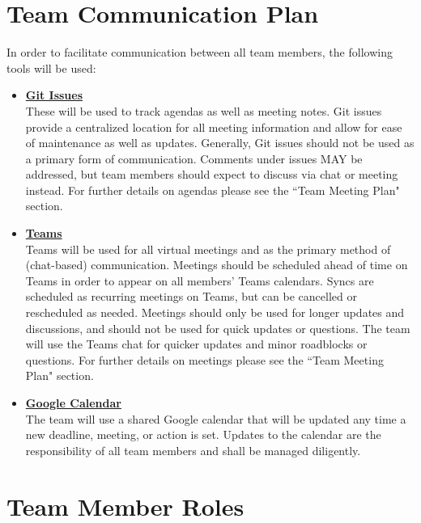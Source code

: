 \documentclass{article}
\begin{document}
\section{Team Communication Plan}
In order to facilitate communication between all team members, the following tools will be used:

\begin{itemize}
	\item \textbf{\underline{Git Issues}} \\
	      These will be used to track agendas as well as meeting notes.
	      Git issues provide a centralized location for all meeting information and allow for ease of maintenance as well as updates.
	      Generally, Git issues should not be used as a primary form of communication.
	      Comments under issues MAY be addressed, but team members should expect to discuss via chat or meeting instead.
	      For further details on agendas please see the ``Team Meeting Plan" section.

	\item \textbf{\underline{Teams}} \\
	      Teams will be used for all virtual meetings and as the primary method of (chat-based) communication.
	      Meetings should be scheduled ahead of time on Teams in order to appear on all members' Teams calendars.
	      Syncs are scheduled as recurring meetings on Teams, but can be cancelled or rescheduled as needed.
	      Meetings should only be used for longer updates and discussions, and should not be used for quick updates or questions.
	      The team will use the Teams chat for quicker updates and minor roadblocks or questions.
	      For further details on meetings please see the ``Team Meeting Plan" section.

	\item \textbf{\underline{Google Calendar}} \\
	      The team will use a shared Google calendar that will be updated any time a new deadline, meeting, or action is set.
	      Updates to the calendar are the responsibility of all team members and shall be managed diligently.

\end{itemize}



\section{Team Member Roles}
\end{document}
